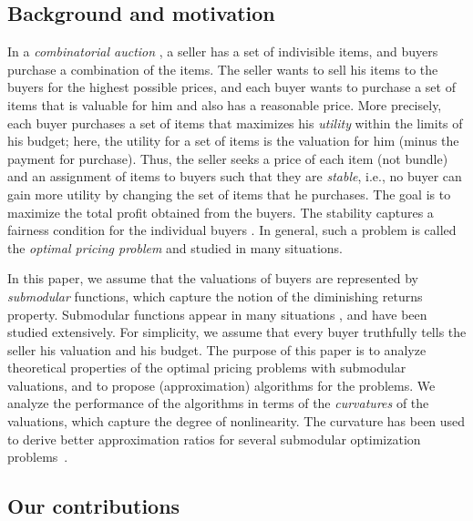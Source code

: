 \documentclass[letterpaper]{article}
\theoremstyle{definition}
\begin{document}
\subsection{Background and motivation}
In a \emph{combinatorial auction} \cite{nisan2007algorithmic11,cramton2006combinatorial},
a seller has a set of indivisible items, and buyers purchase a combination of the items.
The seller wants to sell his items to the buyers for the highest possible prices, and
each buyer wants to purchase a set of items that is valuable for him and also has a reasonable price.
More precisely, each buyer purchases a set of items that maximizes his \emph{utility} within the limits of his budget; here, the utility for a set of items is the valuation for him (minus the payment for purchase).
Thus, the seller seeks a price of each item (not bundle) and an assignment of items to buyers such that they are \emph{stable}, i.e., no buyer can gain more utility by changing the set of items that he purchases.
The goal is to maximize the total profit obtained from the buyers.
The stability captures a fairness condition for the individual buyers \cite{goldberg2003envy,guruswami2005profit,cheung2008approximation,anshelevich2015envy}. %
In general, such a problem is called the \emph{optimal pricing problem} and studied in many situations.







In this paper, we assume that the valuations of buyers are represented by \emph{submodular} functions, which capture the notion of the diminishing returns property.
Submodular functions appear in many situations \cite{bach2010structured,SomaY15}, and have been studied extensively.
For simplicity, %
we assume that every buyer truthfully tells the seller his valuation and his budget.
The purpose of this paper is to analyze theoretical properties of the optimal pricing problems with submodular valuations, and to propose (approximation) algorithms for the problems.
We analyze the performance of the algorithms in terms of the \emph{curvatures} of the valuations, which capture the degree of nonlinearity.
The curvature has been used to derive better approximation ratios for several submodular optimization problems~\cite{iyer2013submodular,iyer2013curvature,sviridenko2015optimal,vondrak2010submodularity}.





\subsection{Our contributions}
\end{document}
